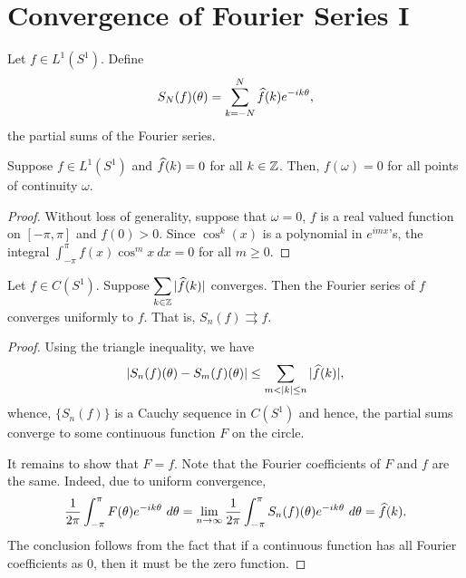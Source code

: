 \section{Convergence of Fourier Series I}

Let $f\in L^1(S^1)$. Define 
\begin{equation*}
    S_N(f)(\theta) = \sum_{k = -N}^N\widehat{f}(k)e^{-ik\theta},
\end{equation*}
the partial sums of the Fourier series.

\begin{theorem}
    Suppose $f\in L^1(S^1)$ and $\widehat{f}(k) = 0$ for all $k\in\mathbb{Z}$. Then, $f(\omega) = 0$ for all points of continuity $\omega$.
\end{theorem}
\begin{proof}
    Without loss of generality, suppose that $\omega = 0$, $f$ is a real valued function on $[-\pi,\pi]$ and $f(0) > 0$. Since $\cos^k(x)$ is a polynomial in $e^{imx}$'s, the integral $\int_{-\pi}^\pi f(x)\cos^mx~dx = 0$ for all $m\ge 0$.
\end{proof}

\begin{proposition}
    Let $f\in C(S^1)$. Suppose $\displaystyle\sum_{k\in\mathbb{Z}}|\widehat{f}(k)|$ converges. Then the Fourier series of $f$ converges uniformly to $f$. That is, $S_n(f)\rightrightarrows f$.
\end{proposition}
\begin{proof}
    Using the triangle inequality, we have 
    \begin{equation*}
        |S_n(f)(\theta) - S_m(f)(\theta)|\le\sum_{m < |k|\le n}|\widehat{f}(k)|,
    \end{equation*}
    whence, $\{S_n(f)\}$ is a Cauchy sequence in $C(S^1)$ and hence, the partial sums converge to some continuous function $F$ on the circle.

    It remains to show that $F = f$. Note that the Fourier coefficients of $F$ and $f$ are the same. Indeed, due to uniform convergence, 
    \begin{equation*}
        \frac{1}{2\pi}\int_{-\pi}^\pi F(\theta)e^{-ik\theta}~d\theta = \lim_{n\to\infty}\frac{1}{2\pi}\int_{-\pi}^\pi S_n(f)(\theta)e^{-ik\theta}~d\theta = \widehat{f}(k).
    \end{equation*}
    The conclusion follows from the fact that if a continuous function has all Fourier coefficients as $0$, then it must be the zero function.
\end{proof}